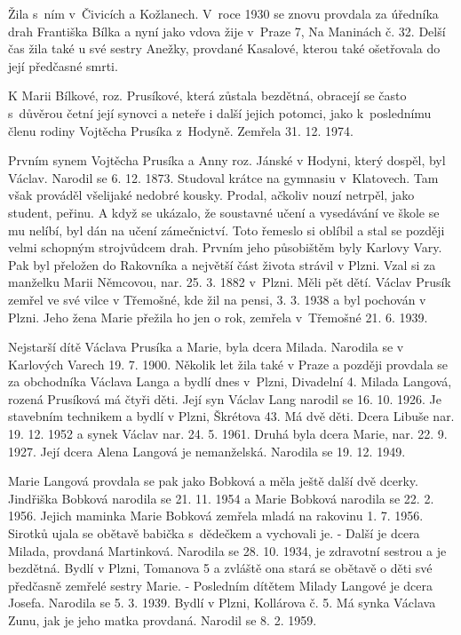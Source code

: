 \documentclass[../dejiny-rodu-prusiku.tex]{subfiles}
\begin{document}
Žila s ním v Čivicích a Kožlanech. V roce 1930 se znovu provdala za úředníka drah Františka Bílka a nyní jako vdova žije v Praze 7, Na Maninách č. 32. Delší čas žila také u své sestry Anežky, provdané Kasalové, kterou také ošetřovala do její předčasné smrti.

K Marii Bílkové, roz. Prusíkové, která zůstala bezdětná, obracejí se často s důvěrou četní její synovci a neteře i další jejich potomci, jako k poslednímu členu rodiny Vojtěcha Prusíka z Hodyně. Zemřela 31. 12. 1974.

Prvním synem Vojtěcha Prusíka a Anny roz. Jánské v Hodyni, který dospěl, byl Václav.  Narodil se 6. 12. 1873. Studoval krátce na gymnasiu v Klatovech. Tam však prováděl všelijaké nedobré kousky. Prodal, ačkoliv nouzí netrpěl, jako student, peřinu. A když se ukázalo, že soustavné učení a vysedávání ve škole se mu nelíbí, byl dán na učení zámečnictví. Toto řemeslo si oblíbil a stal se později velmi schopným strojvůdcem drah. Prvním jeho působištěm byly Karlovy Vary. Pak byl přeložen do Rakovníka a největší část života strávil v Plzni. Vzal si za manželku Marii
Němcovou, nar. 25. 3. 1882 v Plzni. Měli pět dětí. Václav Prusík zemřel ve své vilce v Třemošné, kde žil na pensi, 3. 3. 1938 a byl pochován v Plzni. Jeho žena Marie přežila ho jen o rok, zemřela v Třemošné 21. 6. 1939.

Nejstarší dítě Václava Prusíka a Marie, byla dcera Milada. Narodila se v Karlových Varech 19. 7. 1900. Několik let žila také v Praze a později provdala se za obchodníka Václava Langa a bydlí dnes v Plzni, Divadelní 4. Milada Langová, rozená Prusíková má čtyři děti. Její syn Václav Lang narodil se 16. 10. 1926. Je stavebním technikem a bydlí v Plzni, Škrétova 43. Má dvě děti. Dcera Libuše nar. 19. 12. 1952 a synek Václav nar. 24. 5. 1961. Druhá byla dcera Marie, nar. 22. 9. 1927. Její dcera Alena Langová je nemanželská. Narodi­la se 19. 12. 1949.

Marie Langová provdala se pak jako Bobková a měla ještě další dvě dcerky. Jindřiška Bobková narodila se 21. 11. 1954 a Marie Bobková narodila se 22. 2. 1956. Jejich maminka Marie Bobková zemřela mladá na rakovinu 1. 7. 1956. Sirotků ujala se obětavě babička s dědečkem a vychovali je. - Další je dcera Milada, provdaná Martinková. Narodila se 28. 10. 1934, je zdravotní sestrou a je bezdětná. Bydlí v Plzni, Tomanova 5 a zvláště ona stará se obětavě o děti své předčasně zemřelé sestry Marie. - Posledním dítětem Milady Langové je dcera Josefa. Narodila se 5. 3. 1939. Bydlí v Plzni, Kollárova č. 5. Má synka Václava Zunu, jak je jeho matka provdaná. Narodil se 8. 2. 1959.
\end{document}
